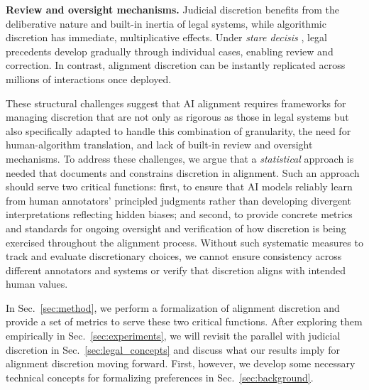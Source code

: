\documentclass{article}
\begin{document}
    
    
    
\textbf{Review and oversight mechanisms.} Judicial discretion benefits from the deliberative nature and built-in inertia of legal systems, while algorithmic discretion has immediate, multiplicative effects.  Under \emph{stare decisis} \cite{nay2024law}, legal precedents develop gradually through individual cases, enabling review and correction. In contrast, alignment discretion can be instantly replicated across millions of interactions once deployed.

These structural challenges suggest that AI alignment requires frameworks for managing discretion that are not only as rigorous as those in legal systems but also specifically adapted to handle this combination of granularity, the need for human-algorithm translation, and lack of built-in review and oversight mechanisms. 
To address these challenges, we argue that a \textit{statistical} approach is needed that documents and constrains discretion in alignment. 
Such an approach should serve two critical functions: first, to ensure that AI models reliably learn from human annotators' principled judgments rather than developing divergent interpretations reflecting hidden biases; and second, to provide concrete metrics and standards for ongoing oversight and verification of how discretion is being exercised throughout the alignment process. Without such systematic measures to track and evaluate discretionary choices, we cannot ensure consistency across different annotators and systems or verify that discretion aligns with intended human values.

In Sec.~\ref{sec:method}, we perform a formalization of alignment discretion and provide a set of metrics to serve these two critical functions. After exploring them empirically in Sec.~\ref{sec:experiments}, we will revisit the parallel with judicial discretion in Sec.~\ref{sec:legal_concepts} and discuss what our results imply for alignment discretion moving forward. First, however, we develop some necessary technical concepts for formalizing preferences in Sec.~\ref{sec:background}.
\end{document}
